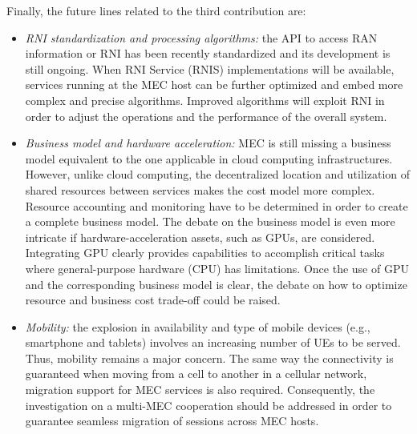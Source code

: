Finally, the future lines related to the third contribution are:
\begin{itemize}
	\item \textit{RNI standardization and processing algorithms:} the API to access RAN information or RNI has been recently standardized and its development is still ongoing. When RNI Service (RNIS) implementations will be available, services running at the MEC host can be further optimized and embed more complex and precise algorithms. Improved algorithms will exploit RNI in order to adjust the operations and the performance of the overall system.
	\item \textit{Business model and hardware acceleration:} MEC is still missing a business model equivalent to the one applicable in cloud computing infrastructures. However, unlike cloud computing, the decentralized location and utilization of shared resources between services makes the cost model more complex. Resource accounting and monitoring have to be determined in order to create a complete business model. The debate on the business model is even more intricate if hardware-acceleration assets, such as GPUs, are considered. Integrating GPU clearly provides capabilities to accomplish critical tasks where general-purpose hardware (CPU) has limitations. Once the use of GPU and the corresponding business model is clear, the debate on how to optimize resource and business cost trade-off could be raised.
	\item \textit{Mobility:} the explosion in availability and type of mobile devices (e.g., smartphone and tablets) involves an increasing number of UEs to be served. Thus, mobility remains a major concern. The same way the connectivity is guaranteed when moving from a cell to another in a cellular network, migration support for MEC services is also required. Consequently, the investigation on a multi-MEC cooperation should be addressed in order to guarantee seamless migration of sessions across MEC hosts.
\end{itemize}